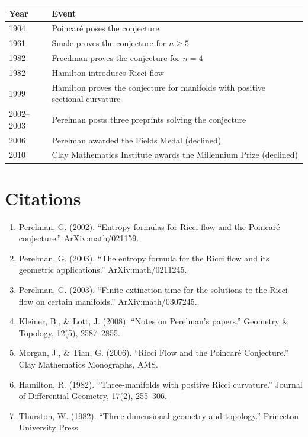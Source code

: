 \begin{tabularx}{\linewidth}{lX}
\toprule
\textbf{Year} & \textbf{Event} \\ \midrule
1904 & Poincar\'e poses the conjecture \\ 
1961 & Smale proves the conjecture for $n \geq 5$ \cite{smale1961} \\ 
1982 & Freedman proves the conjecture for $n = 4$ \cite{freedman1982} \\ 
1982 & Hamilton introduces Ricci flow \cite{hamilton1982} \\ 
1999 & Hamilton proves the conjecture for manifolds with positive sectional curvature \\ 
2002--2003 & Perelman posts three preprints solving the conjecture \cite{perelman2002,perelman2003a,perelman2003b} \\ 
2006 & Perelman awarded the Fields Medal (declined) \\ 
2010 & Clay Mathematics Institute awards the Millennium Prize (declined) \\ \bottomrule
\end{tabularx}

\section{Citations}

\begin{enumerate}
\item Perelman, G. (2002). ``Entropy formulas for Ricci flow and the Poincar\'e conjecture.'' ArXiv:math/021159.
\item Perelman, G. (2003). ``The entropy formula for the Ricci flow and its geometric applications.'' ArXiv:math/0211245.
\item Perelman, G. (2003). ``Finite extinction time for the solutions to the Ricci flow on certain manifolds.'' ArXiv:math/0307245.
\item Kleiner, B., \& Lott, J. (2008). ``Notes on Perelman's papers.'' Geometry \& Topology, 12(5), 2587--2855.
\item Morgan, J., \& Tian, G. (2006). ``Ricci Flow and the Poincar\'e Conjecture.'' Clay Mathematics Monographs, AMS.
\item Hamilton, R. (1982). ``Three-manifolds with positive Ricci curvature.'' Journal of Differential Geometry, 17(2), 255--306.
\item Thurston, W. (1982). ``Three-dimensional geometry and topology.'' Princeton University Press.
\end{enumerate}
